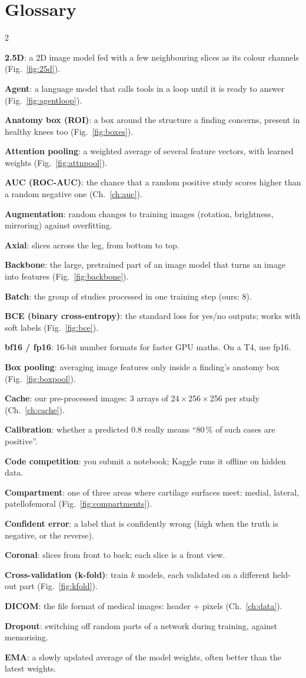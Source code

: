 \chapter{Glossary}
\label{app:glossary}

\begin{multicols}{2}
\small
\setlength{\parskip}{0.35em}
\newcommand{\gl}[2]{\textbf{#1}: #2\par}

\gl{2.5D}{a 2D image model fed with a few neighbouring slices as its colour channels (Fig.~\ref{fig:25d}).}
\gl{Agent}{a language model that calls tools in a loop until it is ready to answer (Fig.~\ref{fig:agentloop}).}
\gl{Anatomy box (ROI)}{a box around the structure a finding concerns, present in healthy knees too (Fig.~\ref{fig:boxes}).}
\gl{Attention pooling}{a weighted average of several feature vectors, with learned weights (Fig.~\ref{fig:attnpool}).}
\gl{AUC (ROC-AUC)}{the chance that a random positive study scores higher than a random negative one (Ch.~\ref{ch:auc}).}
\gl{Augmentation}{random changes to training images (rotation, brightness, mirroring) against overfitting.}
\gl{Axial}{slices across the leg, from bottom to top.}
\gl{Backbone}{the large, pretrained part of an image model that turns an image into features (Fig.~\ref{fig:backbone}).}
\gl{Batch}{the group of studies processed in one training step (ours: 8).}
\gl{BCE (binary cross-entropy)}{the standard loss for yes/no outputs; works with soft labels (Fig.~\ref{fig:bce}).}
\gl{bf16 / fp16}{16-bit number formats for faster GPU maths. On a T4, use fp16.}
\gl{Box pooling}{averaging image features only inside a finding's anatomy box (Fig.~\ref{fig:boxpool}).}
\gl{Cache}{our pre-processed images: 3 arrays of 24\,$\times$\,256\,$\times$\,256 per study (Ch.~\ref{ch:cache}).}
\gl{Calibration}{whether a predicted 0.8 really means ``80\,\% of such cases are positive''.}
\gl{Code competition}{you submit a notebook; Kaggle runs it offline on hidden data.}
\gl{Compartment}{one of three areas where cartilage surfaces meet: medial, lateral, patellofemoral (Fig.~\ref{fig:compartments}).}
\gl{Confident error}{a label that is confidently wrong (high when the truth is negative, or the reverse).}
\gl{Coronal}{slices from front to back; each slice is a front view.}
\gl{Cross-validation (k-fold)}{train $k$ models, each validated on a different held-out part (Fig.~\ref{fig:kfold}).}
\gl{DICOM}{the file format of medical images: header + pixels (Ch.~\ref{ch:data}).}
\gl{Dropout}{switching off random parts of a network during training, against memorising.}
\gl{EMA}{a slowly updated average of the model weights, often better than the latest weights.}

\end{multicols}
